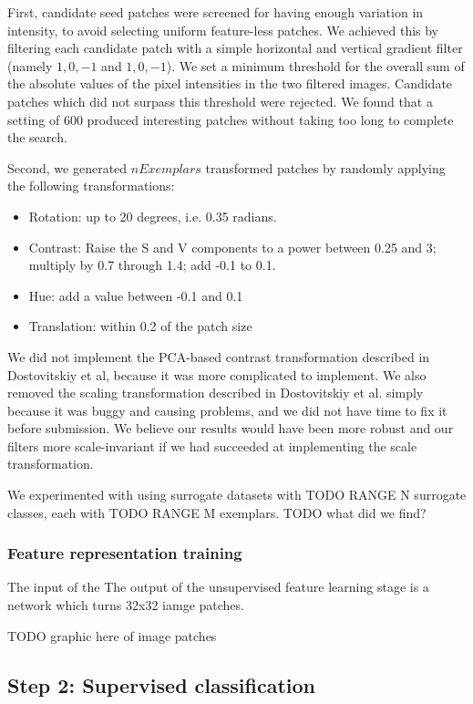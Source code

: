 \documentclass{article} %
\begin{document}
First, candidate seed patches were screened for having enough variation in intensity, to avoid selecting uniform feature-less patches. We achieved this by filtering each candidate patch with a simple horizontal and vertical gradient filter (namely ${{1, 0, -1}}$ and ${{1},{0},{-1}}$). We set a minimum threshold for the overall sum of the absolute values of the pixel intensities in the two filtered images. Candidate patches which did not surpass this threshold were rejected. We found that a setting of $600$ produced interesting patches without taking too long to complete the search.

Second, we generated $nExemplars$ transformed patches by randomly applying the following transformations:

\begin{itemize}
\item Rotation: up to 20 degrees, i.e. 0.35 radians.
\item Contrast: Raise the S and V components to a power between 0.25 and 3; multiply by 0.7 through 1.4; add -0.1 to 0.1.
\item Hue: add a value between -0.1 and 0.1
\item Translation: within 0.2 of the patch size
\end{itemize}

We did not implement the PCA-based contrast transformation described in Dostovitskiy et al, because it was more complicated to implement. We also removed the scaling transformation described in Dostovitskiy et al. simply because it was buggy and causing problems, and we did not have time to fix it before submission. We believe our results would have been more robust and our filters more scale-invariant if we had succeeded at implementing the scale transformation.

We experimented with using surrogate datasets with TODO RANGE N surrogate classes, each with TODO RANGE M exemplars. TODO what did we find?

\subsubsection{Feature representation training}
The input of the The output of the unsupervised feature learning stage is a network which turns 32x32 iamge patches.

TODO graphic here of image patches

\subsection{Step 2: Supervised classification}
\end{document}
